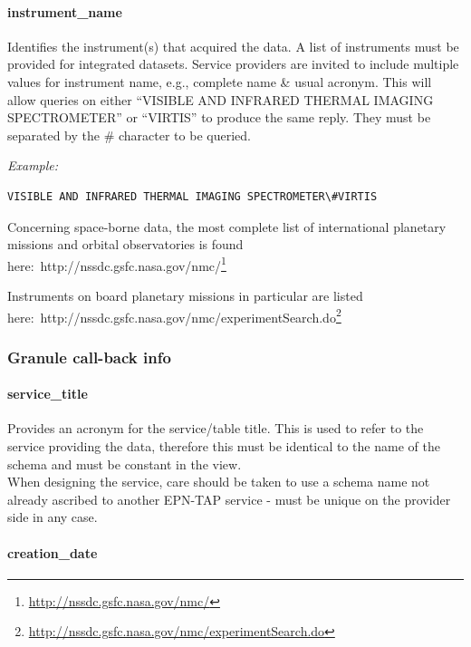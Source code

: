 \documentclass[11pt,a4paper]{ivoa}
\begin{document}
\paragraph{instrument\_name}

Identifies the instrument(s) that acquired the data. A list of instruments must be provided for integrated datasets. Service providers are invited to include multiple values for instrument name, e.g., complete name \& usual acronym. This will allow queries on either ``VISIBLE AND INFRARED THERMAL IMAGING SPECTROMETER'' or ``VIRTIS'' to produce the same reply. They must be separated by the \# character to be queried.

\emph{\emph{Example:}}






\begin{verbatim}VISIBLE AND INFRARED THERMAL IMAGING SPECTROMETER\#VIRTIS\end{verbatim}




Concerning space-borne data, the most complete list of international planetary missions and orbital observatories is found here: http://nssdc.gsfc.nasa.gov/nmc/\footnote{\url{http://nssdc.gsfc.nasa.gov/nmc/}}

Instruments on board planetary missions in particular are listed here: http://nssdc.gsfc.nasa.gov/nmc/experimentSearch.do\footnote{\url{http://nssdc.gsfc.nasa.gov/nmc/experimentSearch.do}}

\subsubsection{Granule call-back info}

\paragraph{service\_title}

Provides an acronym for the service/table title. This is used to refer to the service providing the data, therefore this must be identical to the name of the schema and must be constant in the view.\\When designing the service, care should be taken to use a schema name not already ascribed to another EPN-TAP service - must be unique on the provider side in any case.

\paragraph{creation\_date}
\end{document}
